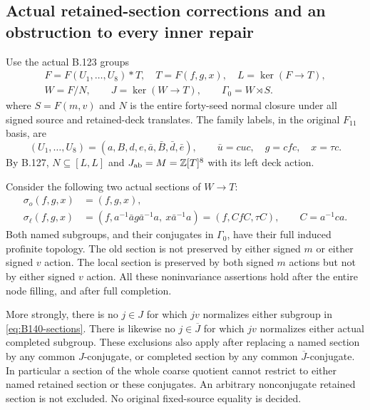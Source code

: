 \subsection*{Actual retained-section corrections and an obstruction to every inner repair}

\label{stmt:B140}
Use the actual B.123 groups
\[
 \begin{gathered}
 F=F(U_1,\ldots,U_8)*T,\quad T=F(f,g,x),\quad L=\ker(F\to T),\\
 W=F/N,\qquad J=\ker(W\to T),\qquad \Gamma_0=W\rtimes S.
 \end{gathered}
\]
where $S=F(m,v)$ and $N$ is the entire forty-seed normal closure
under all signed source and retained-deck translates.
The family labels, in the original $F_{11}$ basis, are
\[
 (U_1,\ldots,U_8)=(a,B,d,e,\bar a,\bar B,\bar d,\bar e),
 \qquad \bar u=cuc,\quad g=cfc,\quad x=\tau c.
\]
By B.127, $N\subseteq[L,L]$ and
$J_{\rm ab}=M=\mathbb Z[T]^8$ with its left deck action.

Consider the following two actual sections of $W\to T$:
\begin{equation}\label{eq:B140-sections}
 \begin{aligned}
 \sigma_o(f,g,x)&=(f,g,x),\\
 \sigma_\ell(f,g,x)
   &=(f,a^{-1}\bar a g\bar a^{-1}a,\ x\bar a^{-1}a)
     =(f,CfC,\tau C),\qquad C=a^{-1}ca .
 \end{aligned}
\end{equation}
Both named subgroups, and their conjugates in $\Gamma_0$,
have their full induced profinite topology.
The old section is not preserved by either signed $m$ or
either signed $v$ action. The local section is preserved
by both signed $m$ actions but not by either signed $v$ action.
All these noninvariance assertions hold after the entire
node filling, and after full completion.

More strongly, there is no $j\in J$ for which $jv$
normalizes either subgroup in \eqref{eq:B140-sections}.
There is likewise no $j\in\overline J$ for which $jv$
normalizes either actual completed subgroup.
These exclusions also apply after replacing a named section
by any common $J$-conjugate, or completed section by any
common $\overline J$-conjugate.
In particular a section of the whole coarse quotient cannot
restrict to either named retained section or these conjugates.
An arbitrary nonconjugate retained section is not excluded.
No original fixed-source equality is decided.

